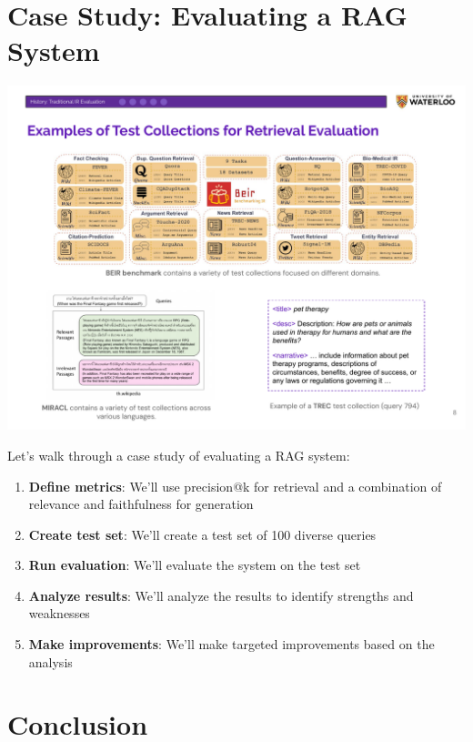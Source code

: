 \documentclass[
  letterpaper,
  oneside]{scrbook}
\providecommand{\tightlist}{%
  \setlength{\itemsep}{0pt}\setlength{\parskip}{0pt}}\usepackage{longtable,booktabs,array}
\begin{document}
\section{Case Study: Evaluating a RAG
System}\label{case-study-evaluating-a-rag-system}

\includegraphics{chapters/../p2-images/slide_8.png}

Let's walk through a case study of evaluating a RAG system:

\begin{enumerate}
\def\labelenumi{\arabic{enumi}.}
\tightlist
\item
  \textbf{Define metrics}: We'll use precision@k for retrieval and a
  combination of relevance and faithfulness for generation
\item
  \textbf{Create test set}: We'll create a test set of 100 diverse
  queries
\item
  \textbf{Run evaluation}: We'll evaluate the system on the test set
\item
  \textbf{Analyze results}: We'll analyze the results to identify
  strengths and weaknesses
\item
  \textbf{Make improvements}: We'll make targeted improvements based on
  the analysis
\end{enumerate}

\section{Conclusion}\label{conclusion-1}
\end{document}
